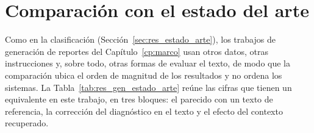 \section{Comparación con el estado del arte}
\label{sec:res_gen_estado_arte}

Como en la clasificación (Sección~\ref{sec:res_estado_arte}), los trabajos de generación de reportes del
Capítulo~\ref{cp:marco} usan otros datos, otras instrucciones y, sobre todo, otras formas de evaluar el texto, de modo
que la comparación ubica el orden de magnitud de los resultados y no ordena los sistemas. La
Tabla~\ref{tab:res_gen_estado_arte} reúne las cifras que tienen un equivalente en este trabajo, en tres bloques: el
parecido con un texto de referencia, la corrección del diagnóstico en el texto y el efecto del contexto recuperado.

